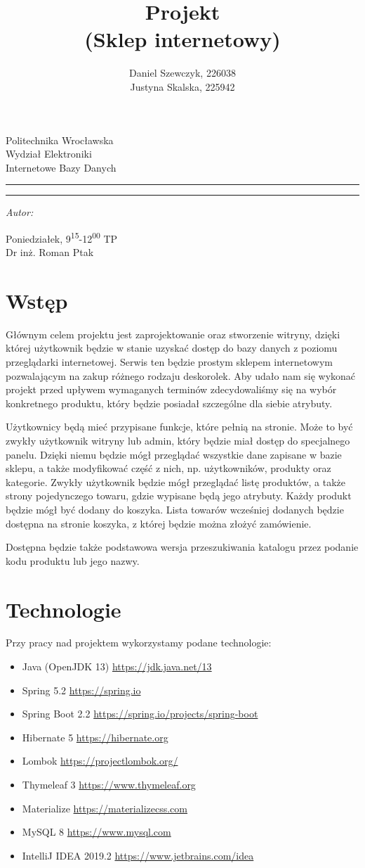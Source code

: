 \documentclass[12pt,a4paper,titlepage]{article}
\author{Daniel Szewczyk, 226038\\
        Justyna Skalska, 225942}
\title{Projekt\\
\large(Sklep internetowy)}
\makeatletter
\newcommand{\linia}{\rule{\linewidth}{0.4mm}}
\renewcommand{\maketitle}{\begin{titlepage}
    \vspace*{1cm}
    \begin{center}\small
    Politechnika Wrocławska\\
    Wydział Elektroniki\\
    Internetowe Bazy Danych
    \end{center}
    \vspace{3cm}
    \noindent\linia
    \begin{center}
      \LARGE \textsc{\@title}
         \end{center}
     \linia
    \vspace{0.5cm}
    \begin{flushright}
    \begin{minipage}{7cm}
    \textit{\small Autor:}\\
    \normalsize \textsc{\@author} \par
    \end{minipage}
    \vspace{5cm}

     {\small Poniedziałek, 9\textsuperscript{15}-12\textsuperscript{00} TP}\\
        Dr inż. Roman Ptak
     \end{flushright}
    \vspace*{\stretch{6}}
    \begin{center}
    \@date
    \end{center}
  \end{titlepage}%
}
\makeatother
\begin{document}
\maketitle
\newpage
\tableofcontents
\newpage
\listoffigures

\newpage
\listoflistings


\newpage

\section{Wstęp}
Głównym celem projektu jest zaprojektowanie oraz stworzenie witryny, dzięki której użytkownik będzie w stanie uzyskać dostęp do bazy danych z poziomu przeglądarki internetowej. Serwis ten będzie prostym sklepem internetowym pozwalającym na zakup różnego rodzaju deskorolek. Aby udało nam się wykonać projekt przed upływem wymaganych terminów zdecydowaliśmy się na wybór konkretnego produktu, który będzie posiadał szczególne dla siebie atrybuty.

Użytkownicy będą mieć przypisane funkcje, które pełnią na stronie. Może to być zwykły użytkownik witryny lub admin, który będzie miał dostęp do specjalnego panelu. Dzięki niemu będzie mógł przeglądać wszystkie dane zapisane w bazie sklepu, a także modyfikować część z nich, np. użytkowników, produkty oraz kategorie. Zwykły użytkownik będzie mógł przeglądać listę produktów, a także strony pojedynczego towaru, gdzie wypisane będą jego atrybuty. Każdy produkt będzie mógł być dodany do koszyka. Lista towarów wcześniej dodanych będzie dostępna na stronie koszyka, z której będzie można złożyć zamówienie.

Dostępna będzie także podstawowa wersja przeszukiwania katalogu przez podanie kodu produktu lub jego nazwy.

\newpage
\section{Technologie}
\label{sec:tech}
Przy pracy nad projektem wykorzystamy podane technologie:
\begin{itemize}
    \item Java (OpenJDK 13) \tab\url{https://jdk.java.net/13}
    \item Spring 5.2 \tab\url{https://spring.io}
    \item Spring Boot 2.2 \tab\url{https://spring.io/projects/spring-boot}
    \item Hibernate 5 \tab\url{https://hibernate.org}
    \item Lombok \tab\url{https://projectlombok.org/}
    \item Thymeleaf 3 \tab\url{https://www.thymeleaf.org}
    \item Materialize \tab\url{https://materializecss.com}
    \item MySQL 8 \tab\url{https://www.mysql.com}
    \item IntelliJ IDEA 2019.2 \tab\url{https://www.jetbrains.com/idea}
\end{itemize}
\end{document}
